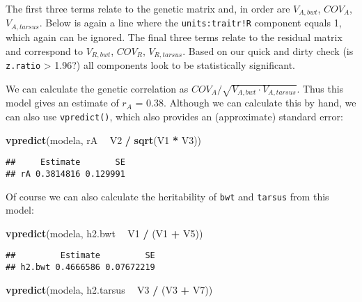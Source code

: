\documentclass[12pt,]{book}
\newenvironment{Shaded}{\begin{snugshade}}{\end{snugshade}}
\newcommand{\KeywordTok}[1]{\textcolor[rgb]{0.13,0.29,0.53}{\textbf{#1}}}
\newcommand{\NormalTok}[1]{#1}
\newcommand{\OperatorTok}[1]{\textcolor[rgb]{0.81,0.36,0.00}{\textbf{#1}}}
\newcommand{\StringTok}[1]{\textcolor[rgb]{0.31,0.60,0.02}{#1}}
\begin{document}
The first three terms relate to the genetic matrix and, in order are \(V_{A,bwt}\), \(COV_A\), \(V_{A, tarsus}\). Below is again a line where the \texttt{units:traitr!R} component equals 1, which again can be ignored. The final three terms relate to the residual matrix and correspond to \(V_{R,bwt}\), \(COV_R\), \(V_{R,tarsus}\). Based on our quick and dirty check (is \texttt{z.ratio} \textgreater{} 1.96?) all components look to be statistically significant.

We can calculate the genetic correlation as \(COV_A / \sqrt{V_{A,bwt} \cdot V_{A,tarsus}}\). Thus this model gives an estimate of \(r_A\) = 0.38. Although we can calculate this by hand, we can also use \texttt{vpredict()}, which also provides an (approximate) standard error:

\begin{Shaded}
\begin{Highlighting}[]
\KeywordTok{vpredict}\NormalTok{(modela, rA }\OperatorTok{~}\StringTok{ }\NormalTok{V2 }\OperatorTok{/}\StringTok{ }\KeywordTok{sqrt}\NormalTok{(V1 }\OperatorTok{*}\StringTok{ }\NormalTok{V3))}
\end{Highlighting}
\end{Shaded}

\begin{verbatim}
##     Estimate       SE
## rA 0.3814816 0.129991
\end{verbatim}

Of course we can also calculate the heritability of \texttt{bwt} and \texttt{tarsus} from this model:

\begin{Shaded}
\begin{Highlighting}[]
\KeywordTok{vpredict}\NormalTok{(modela, h2.bwt }\OperatorTok{~}\StringTok{ }\NormalTok{V1 }\OperatorTok{/}\StringTok{ }\NormalTok{(V1 }\OperatorTok{+}\StringTok{ }\NormalTok{V5))}
\end{Highlighting}
\end{Shaded}

\begin{verbatim}
##         Estimate         SE
## h2.bwt 0.4666586 0.07672219
\end{verbatim}

\begin{Shaded}
\begin{Highlighting}[]
\KeywordTok{vpredict}\NormalTok{(modela, h2.tarsus }\OperatorTok{~}\StringTok{ }\NormalTok{V3 }\OperatorTok{/}\StringTok{ }\NormalTok{(V3 }\OperatorTok{+}\StringTok{ }\NormalTok{V7))}
\end{Highlighting}
\end{Shaded}
\end{document}
